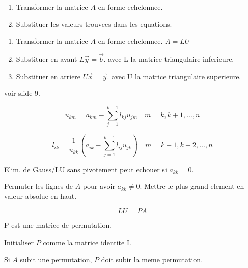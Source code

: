 

\begin{enumerate}
    \item Transformer la matrice $A$ en forme echelonnee.
    \item Substituer les valeurs trouvees dans les equations.
\end{enumerate}


\begin{enumerate}
    \item Transformer la matrice $A$ en forme echelonnee. $ A = LU $
    \item Substituer en avant $ L\vec{y} = \vec{b} $. avec L la matrice triangulaire inferieure.
    \item Substituer en arriere $ U\vec{x} = \vec{y} $. avec U la matrice triangulaire superieure.
\end{enumerate}

voir slide 9.


$$u_{km} = a_{km} - \sum_{j=1}^{k-1} l_{kj}u_{jm} \quad m = k, k+1, \dots, n $$

$$l_{ik} = \frac{1}{u_{kk}} \left( a_{ik} - \sum_{j=1}^{k-1} l_{ij}u_{jk} \right) \quad m = k+1, k+2, \dots, n$$


Elim. de Gauss/LU sans pivotement peut echouer si $a_{kk} = 0$.

Permuter les lignes de $A$ pour avoir $a_{kk} \neq 0$.
Mettre le plus grand element en valeur absolue en haut.

$$LU= PA$$

P est une matrice de permutation.

Initialiser $P$ comme la matrice identite I.

Si $A$ subit une permutation, $P$ doit subir la meme permutation.
